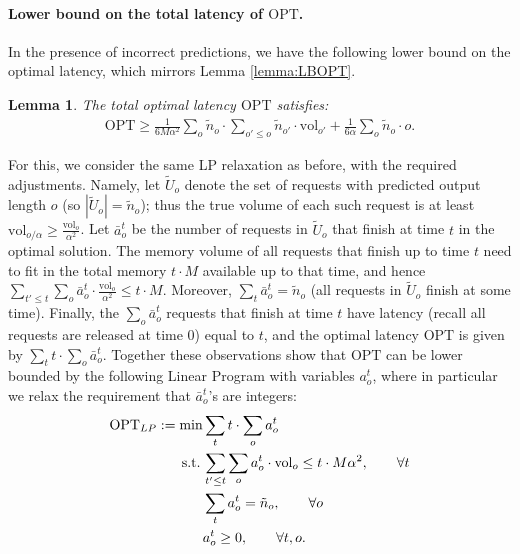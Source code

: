 \documentclass[11pt, a4paper]{article}
\theoremstyle{plain}
\newtheorem{lemma}[theorem]{Lemma}
\theoremstyle{definition}
\theoremstyle{remark}
\newcommand{\OPT}{\text{OPT}}
\newcommand{\vol}{\textrm{vol}}
\begin{document}

\paragraph{Lower bound on the total latency of $\OPT$.} 

In the presence of incorrect predictions, we have the following lower bound on the optimal latency, which mirrors Lemma \ref{lemma:LBOPT}.

\begin{lemma} \label{lemma:LBOPT2}
	The total optimal latency $\OPT$ satisfies:
	\begin{align*}
		\OPT \ge \frac{1}{6M\alpha^2} \sum_o \tilde{n}_o \cdot \sum_{o' \le o} \tilde{n}_{o'} \cdot \vol_{o'} + \frac{1}{6\alpha} \sum_o \tilde{n}_o \cdot o.
	\end{align*}
\end{lemma}

For this, we consider the same LP relaxation as before, with the required adjustments. Namely, let $\tilde{U}_o$ denote the set of requests with predicted output length $o$ (so $|\tilde{U}_o| = \tilde{n}_o$); thus the true volume of each such request is at least $\vol_{o/\alpha} \ge \frac{\vol_o}{\alpha^2}$. Let $\bar{a}^t_o$ be the number of requests in $\tilde{U}_o$ that finish at time $t$ in the optimal solution. The memory volume of all requests that finish up to time $t$ need to fit in the total memory $t \cdot M$ available up to that time, and hence $\sum_{t' \le t} \sum_o \bar{a}^t_o \cdot \frac{\vol_o}{\alpha^2} \le t \cdot M$. Moreover, $\sum_t \bar{a}^t_o = \tilde{n}_o$ (all requests in $\tilde{U}_o$ finish at some time). Finally, the $\sum_o \bar{a}^t_o$ requests that finish at time $t$ have latency (recall all requests are released at time 0) equal to $t$, and the optimal latency $\OPT$ is given by $\sum_t t \cdot \sum_o \bar{a}^t_o$. Together these observations show that $\OPT$ can be lower bounded by the following Linear Program with variables $a^t_o$, where in particular we relax the requirement that $\bar{a}^t_o$'s are integers:
%
\begin{align}
	\OPT_{LP} := \min &\sum_t t \cdot \sum_o a_o^t \notag\\
	\textrm{s.t.}\,& \sum_{t' \le t} \sum_o a^t_o \cdot \vol_o \le t \cdot M \alpha^2, \qquad \forall t \label{eq:LPmem2}\\
	&\sum_t a^t_o = \tilde{n}_o, \qquad \forall o \notag\\
	&a^t_o \ge 0, \qquad \forall t,o. \notag
\end{align}
\end{document}
